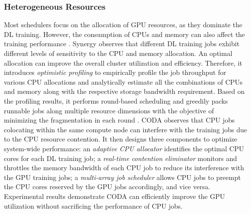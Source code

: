 \subsubsection{Heterogeneous Resources}
\label{sec:train-resource-heter}
Most schedulers focus on the allocation of GPU resources, as they dominate the DL training. However, the consumption of CPUs and memory can also affect the training performance {\tiny{}}. Synergy \cite{Synergy} observes that different DL training jobs exhibit different levels of sensitivity to the CPU and memory allocation. An optimal allocation can improve the overall cluster utilization and efficiency. Therefore, it introduces \emph{optimistic profiling} to empirically profile the job throughput for various CPU allocations and analytically estimate all the combinations of CPUs and memory along with the respective storage bandwidth requirement. Based on the profiling results, it performs round-based scheduling and greedily packs runnable jobs along multiple resource dimensions with the objective of minimizing the fragmentation in each round {\tiny{}}. CODA \cite{CODA} observes that CPU jobs colocating within the same compute node can interfere with the training jobs due to the CPU resource contention. It then designs three components to optimize system-wide performance: an \emph{adaptive CPU allocator} identifies the optimal CPU cores for each DL training job; a \emph{real-time contention eliminator} monitors and throttles the memory bandwidth of each CPU job to reduce its interference with the GPU training jobs; a \emph{multi-array job scheduler} allows CPU jobs to preempt the CPU cores reserved by the GPU jobs accordingly, and vice versa. Experimental results demonstrate CODA can efficiently improve the GPU utilization without sacrificing the performance of CPU jobs.

